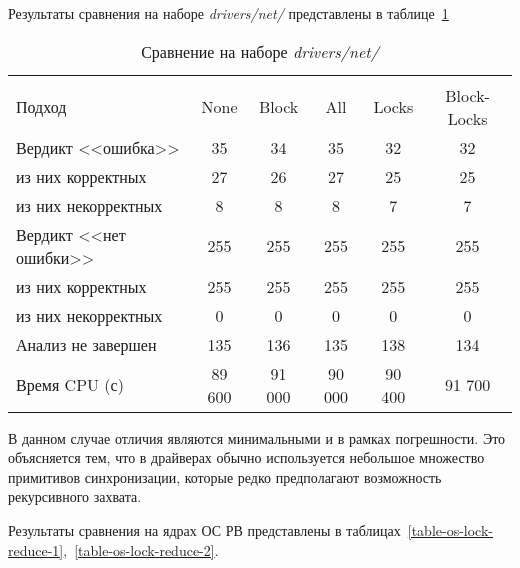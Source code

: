 Результаты сравнения на наборе \textit{drivers/net/} представлены в таблице~\ref{table-drivers-lock-reduce}

  \begin{table}[h]\footnotesize \centering
    \caption{Сравнение на наборе \textit{drivers/net/}}
  	\label{table-drivers-lock-reduce}
    \begin{tabular}{ | l | c | c | c | c | c |}
      \hline
      		& 		\multicolumn{5}{c|}{\combatmode}  \\
      Подход         				& None 	& Block 	& All 		& Locks 	& Block-Locks \\ \hline
      Вердикт <<ошибка>> 			& 35   	& 34       	& 35    	& 32       	& 32     \\ 
  \hspace{0.5cm} из них корректных 	& 27 	& 26 		& 27    	& 25       	& 25   \\ 
  \hspace{0.5cm} из них некорректных & 8 	& 8 		& 8     	& 7       	& 7    \\ \hline
      Вердикт <<нет ошибки>>  		& 255   & 255       & 255   	& 255       & 255     \\ 
  \hspace{0.5cm} из них корректных 	& 255 	& 255    	& 255   	& 255       & 255     \\
  \hspace{0.5cm} из них некорректных & 0 	& 0    		& 0     	& 0       	& 0  \\ \hline
      Анализ не завершен       		& 135    & 136      & 135    	& 138       & 134  \\ \hline
      Время CPU (с)   				& 89 600 & 91 000   & 90 000    & 90 400    & 91 700  \\ 
      \hline
    \end{tabular}
  \end{table}

В данном случае отличия являются минимальными и в рамках погрешности. 
Это объясняется тем, что в драйверах обычно используется небольшое множество примитивов синхронизации, которые редко предполагают возможность рекурсивного захвата.

Результаты сравнения на ядрах ОС РВ представлены в таблицах~\ref{table-os-lock-reduce-1},~\ref{table-os-lock-reduce-2}.

